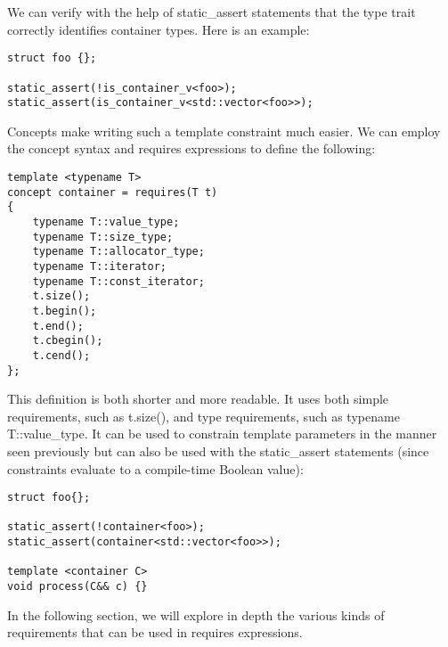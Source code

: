 We can verify with the help of static\_assert statements that the type trait correctly identifies container types. Here is an example:

\begin{lstlisting}[style=styleCXX]
struct foo {};

static_assert(!is_container_v<foo>);
static_assert(is_container_v<std::vector<foo>>);
\end{lstlisting}

Concepts make writing such a template constraint much easier. We can employ the concept syntax and requires expressions to define the following:

\begin{lstlisting}[style=styleCXX]
template <typename T>
concept container = requires(T t)
{
	typename T::value_type;
	typename T::size_type;
	typename T::allocator_type;
	typename T::iterator;
	typename T::const_iterator;
	t.size();
	t.begin();
	t.end();
	t.cbegin();
	t.cend();
};
\end{lstlisting}

This definition is both shorter and more readable. It uses both simple requirements, such as t.size(), and type requirements, such as typename T::value\_type. It can be used to constrain template parameters in the manner seen previously but can also be used with the static\_assert statements (since constraints evaluate to a compile-time Boolean value):

\begin{lstlisting}[style=styleCXX]
struct foo{};

static_assert(!container<foo>);
static_assert(container<std::vector<foo>>);

template <container C>
void process(C&& c) {}
\end{lstlisting}

In the following section, we will explore in depth the various kinds of requirements that can be used in requires expressions.


























